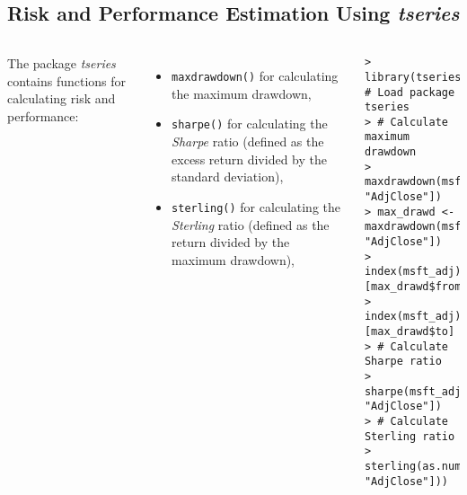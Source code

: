 \documentclass[10pt]{beamer}\usepackage[]{graphicx}\usepackage[]{color}
\makeatletter
\newenvironment{kframe}{%
 \def\at@end@of@kframe{}%
 \ifinner\ifhmode%
  \def\at@end@of@kframe{\end{minipage}}%
  \begin{minipage}{\columnwidth}%
 \fi\fi%
 \def\FrameCommand##1{\hskip\@totalleftmargin \hskip-\fboxsep
 \colorbox{shadecolor}{##1}\hskip-\fboxsep
     \hskip-\linewidth \hskip-\@totalleftmargin \hskip\columnwidth}%
 \MakeFramed {\advance\hsize-\width
   \@totalleftmargin\z@ \linewidth\hsize
   \@setminipage}}%
 {\par\unskip\endMakeFramed%
 \at@end@of@kframe}
\newenvironment{knitrout}{}{} %
\makeatother
\begin{document}
\subsection{Risk and Performance Estimation Using \protect\emph{tseries}}
\begin{frame}[fragile,t]{\subsecname}
\vspace{-1em}
\begin{block}{}
  \begin{columns}[T]
      The package \emph{tseries} contains functions for calculating risk and performance:
      \begin{itemize}
        \item \texttt{maxdrawdown()} for calculating the maximum drawdown,
        \item \texttt{sharpe()} for calculating the \emph{Sharpe} ratio (defined as the excess return divided by the standard deviation),
        \item \texttt{sterling()} for calculating the \emph{Sterling} ratio (defined as the return divided by the maximum drawdown),
      \end{itemize}
      \vspace{-1em}
\begin{knitrout}\tiny
{}\color{fgcolor}\begin{kframe}
\begin{verbatim}
> library(tseries)  # Load package tseries
> # Calculate maximum drawdown
> maxdrawdown(msft_adj[, "AdjClose"])
> max_drawd <- maxdrawdown(msft_adj[, "AdjClose"])
> index(msft_adj)[max_drawd$from]
> index(msft_adj)[max_drawd$to]
> # Calculate Sharpe ratio
> sharpe(msft_adj[, "AdjClose"])
> # Calculate Sterling ratio
> sterling(as.numeric(msft_adj[, "AdjClose"]))
\end{verbatim}
\end{kframe}
\end{knitrout}
  \end{columns}
\end{block}

\end{frame}


\end{document}
